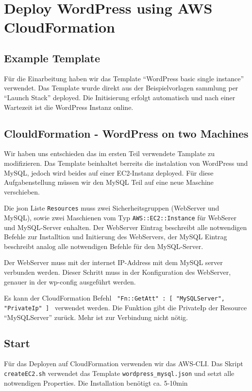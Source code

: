 \section{Deploy WordPress using AWS CloudFormation}

\subsection{Example Template}
Für die Einarbeitung haben wir das Template \enquote{WordPress basic single instance} verwendet. Das Template wurde direkt aus der Beispielvorlagen sammlung per \enquote{Launch Stack} deployed. Die Initisierung erfolgt automatisch und nach einer Wartezeit ist die WordPress Instanz online.

\subsection{ClouldFormation - WordPress on two Machines}
Wir haben uns entschieden das im ersten Teil verwendete Tamplate zu modifizieren. Das Template beinhaltet berreits die instalation von WordPress und MySQL, jedoch wird beides auf einer EC2-Instanz deployed. Für diese Aufgabenstellung müssen wir den MySQL Teil auf eine neue Maschine verschieben.

Die json Liste \texttt{Resources} muss zwei Sicherheitsgruppen (WebServer und MySQL), sowie zwei Maschienen vom Typ \texttt{AWS::EC2::Instance} für WebSerer und MySQL-Server enhalten. Der WebServer Eintrag beschreibt alle notwendigen Befehle zur Installtion und Initierung des WebServers, der MySQL Eintrag beschreibt analog alle notwendigen Befehle für den MySQL-Server.

Der WebServer muss mit der internet IP-Address mit dem MySQL server verbunden werden. Dieser Schritt muss in der Konfiguration des WebServer, genauer in der wp-config ausgeführt werden.

Es kann der CloudFormation Befehl \texttt{{ "Fn::GetAtt" : [ "MySQLServer", "PrivateIp" ] }} verwendet werden. Die Funktion gibt die PrivateIp der Resource \enquote{MySQLServer} zurück. Mehr ist zur Verbindung nicht nötig.

\subsection{Start}
Für das Deployen auf CloudFormation verwenden wir das AWS-CLI. Das Skript \texttt{createEC2.sh} verwendet das Template \texttt{wordpress_mysql.json} und setzt alle notwendigen Properties. Die Installation benötigt ca. 5-10min
